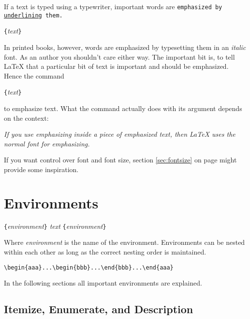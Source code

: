 If a text is typed using a typewriter, important words are
  \texttt{emphasized by \underline{underlining} them.}
\begin{lscommand}
\verb|{|\emph{text}\verb|}|
\end{lscommand}
In printed books,
however, words are emphasized by typesetting them in an \emph{italic}
font.  As an author you shouldn't care either way. The important bit is, to tell \LaTeX{} that a
particular bit of text is important and should be emphasized. Hence the command
\begin{lscommand}
\verb|{|\emph{text}\verb|}|
\end{lscommand}
\noindent to emphasize text. What the command actually does with
its argument depends on the context:

\begin{example}
\emph{If you use
  emphasizing inside a piece
  of emphasized text, then
  \LaTeX{} uses the
  \emph{normal} font for
  emphasizing.}
\end{example}

If you want control over font and font size, section \ref{sec:fontsize} on
page \pageref{sec:fontsize} might provide some inspiration.

\section{Environments} \label{env}

\begin{lscommand}
\verb|{|\emph{environment}\verb|}|\quad
   \emph{text}\quad
{}\verb|{|\emph{environment}\verb|}|
\end{lscommand}
\noindent Where \emph{environment} is the name of the environment. Environments can be
nested within each other as long as the correct nesting order is
maintained.
\begin{code}
\verb|\begin{aaa}...\begin{bbb}...\end{bbb}...\end{aaa}|
\end{code}

\noindent In the following sections all important environments are explained.

\subsection{Itemize, Enumerate, and Description}

